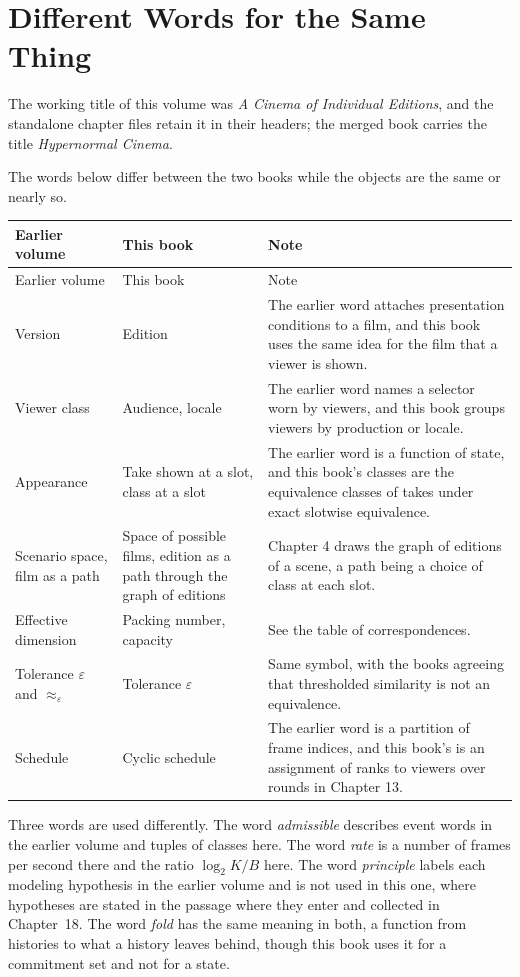 \documentclass[11pt,twoside,openright]{book}
\theoremstyle{plain}
\theoremstyle{definition}
\theoremstyle{remark}
\begin{document}
\section{Different Words for the Same Thing}\label{sec:words}

The working title of this volume was \emph{A Cinema of Individual Editions}, and the standalone chapter files retain it in their headers; the merged book carries the title \emph{Hypernormal Cinema}.

The words below differ between the two books while the objects are the same or nearly so.

\begin{longtable}{@{}>{\raggedright\arraybackslash}p{3.3cm}>{\raggedright\arraybackslash}p{3.3cm}>{\raggedright\arraybackslash}p{5.9cm}@{}}
\toprule
Earlier volume & This book & Note\\
\midrule
\endfirsthead
\toprule
Earlier volume & This book & Note\\
\midrule
\endhead
\bottomrule
\endfoot
Version & Edition & The earlier word attaches presentation conditions to a film, and this book uses the same idea for the film that a viewer is shown.\\
Viewer class & Audience, locale & The earlier word names a selector worn by viewers, and this book groups viewers by production or locale.\\
Appearance & Take shown at a slot, class at a slot & The earlier word is a function of state, and this book's classes are the equivalence classes of takes under exact slotwise equivalence.\\
Scenario space, film as a path & Space of possible films, edition as a path through the graph of editions & Chapter 4 draws the graph of editions of a scene, a path being a choice of class at each slot.\\
Effective dimension & Packing number, capacity & See the table of correspondences.\\
Tolerance $\varepsilon$ and $\approx_\varepsilon$ & Tolerance $\varepsilon$ & Same symbol, with the books agreeing that thresholded similarity is not an equivalence.\\
Schedule & Cyclic schedule & The earlier word is a partition of frame indices, and this book's is an assignment of ranks to viewers over rounds in Chapter 13.\\
\end{longtable}

Three words are used differently. The word \emph{admissible} describes event words in the earlier volume and tuples of classes here. The word \emph{rate} is a number of frames per second there and the ratio $\log_2K/B$ here. The word \emph{principle} labels each modeling hypothesis in the earlier volume and is not used in this one, where hypotheses are stated in the passage where they enter and collected in Chapter~18. The word \emph{fold} has the same meaning in both, a function from histories to what a history leaves behind, though this book uses it for a commitment set and not for a state.
\end{document}
